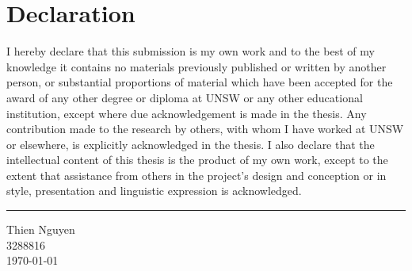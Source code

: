 \section*{Declaration}
I hereby declare that this submission is my own work and to the best of my 
knowledge it contains no materials previously published or written by another 
person, or substantial proportions of material which have been accepted for the 
award of any other degree or diploma at UNSW or any other educational 
institution, except where due acknowledgement is made in the thesis. Any 
contribution made to the research by others, with whom I have worked at 
UNSW or elsewhere, is explicitly acknowledged in the thesis. I also declare that 
the intellectual content of this thesis is the product of my own work, except to 
the extent that assistance from others in the project's design and conception or 
in style, presentation and linguistic expression is acknowledged. \vspace{1cm}
\hrule \vspace{1cm}
Thien Nguyen\\
3288816 \\
\today

